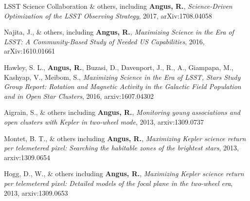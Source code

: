 \documentclass[12pt,letterpaper]{article}
\begin{document}
\begin{list}{}{\cvlist}
\item
    LSST Science Collaboration \& others, including {\bf Angus, R.},
    {\it Science-Driven Optimization of the LSST Observing Strategy}, 2017,
    arXiv:1708.04058
\item
    Najita, J., \& others, including {\bf Angus, R.}, {\it Maximizing Science
    in the Era of LSST: A Community-Based Study of Needed US Capabilities},
    2016, arXiv:1610.01661
\item
    Hawley, S. L., {\bf Angus, R.}, Buzasi, D., Davenport, J., R., A.,
    Giampapa, M., Kashyap, V., Meibom, S., {\it Maximizing Science in the Era
    of LSST, Stars Study Group Report: Rotation and Magnetic Activity in the
    Galactic Field Population and in Open Star Clusters}, 2016,
    arxiv:1607.04302
\item
    Aigrain, S., \& others including {\bf Angus, R.},
    {\it Monitoring young associations and open clusters with
    Kepler in two-wheel mode}, 2013, arxiv:1309.0737
\item
    Montet, B. T., \& others including {\bf Angus, R.},
    {\it Maximizing Kepler science return per telemetered pixel: Searching the
    habitable zones of the brightest stars}, 2013, arxiv:1309.0654
\item
    Hogg, D., W., \& others including {\bf Angus, R.},
    {\it Maximizing Kepler science return per telemetered pixel: Detailed
    models of the focal plane in the two-wheel era}, 2013, arxiv:1309.0653
\end{list}

%     

%     
\end{document}
